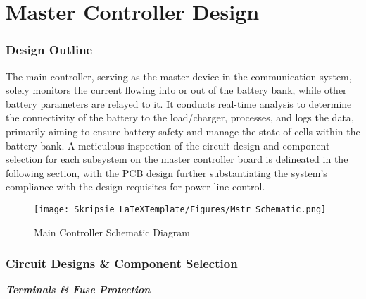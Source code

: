 \section{Master Controller Design}\label{subsec:mstr_contt}
\subsubsection{Design Outline}\label{subsec:mmmm4}
The main controller, serving as the master device in the communication system, solely monitors the current flowing into or out of the battery bank, while other battery parameters are relayed to it. It conducts real-time analysis to determine the connectivity of the battery to the load/charger, processes, and logs the data, primarily aiming to ensure battery safety and manage the state of cells within the battery bank. A meticulous inspection of the circuit design and component selection for each subsystem on the master controller board is delineated in the following section, with the PCB design further substantiating the system's compliance with the design requisites for power line control.

\begin{figure}[h!]
\centering
\texttt{[image: Skripsie\_LaTeXTemplate/Figures/Mstr\_Schematic.png]}
\caption{Main Controller Schematic Diagram}
\label{fig:Mstr_Schema}
\end{figure}
\newpage
\subsubsection{Circuit Designs \& Component Selection}\label{subsec:mmmm5}
\textbf{\emph{Terminals \& Fuse Protection}}\label{subsubsec:mstr_terminals_dsgn}


